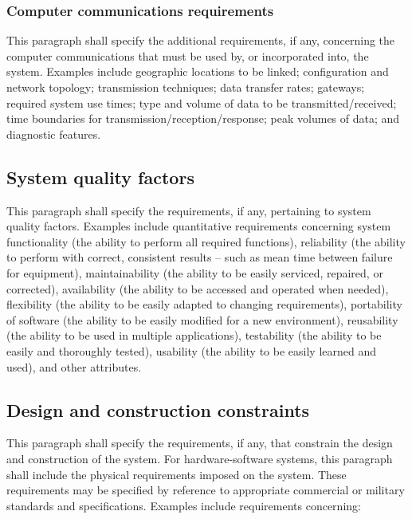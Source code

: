 \documentclass{fidata-report-template}
\begin{document}
\subsubsection{Computer communications requirements}

This paragraph shall specify the additional requirements, if any,
concerning the computer communications that must be used by, or
incorporated into, the system. Examples include geographic locations to
be linked; configuration and network topology; transmission techniques;
data transfer rates; gateways; required system use times; type and
volume of data to be transmitted/received; time boundaries for
transmission/reception/response; peak volumes of data; and diagnostic
features.

\subsection{System quality factors}

This paragraph shall specify the requirements, if any, pertaining to
system quality factors. Examples include quantitative requirements
concerning system functionality (the ability to perform all required
functions), reliability (the ability to perform with correct, consistent
results -- such as mean time between failure for equipment),
maintainability (the ability to be easily serviced, repaired, or
corrected), availability (the ability to be accessed and operated when
needed), flexibility (the ability to be easily adapted to changing
requirements), portability of software (the ability to be easily
modified for a new environment), reusability (the ability to be used in
multiple applications), testability (the ability to be easily and
thoroughly tested), usability (the ability to be easily learned and
used), and other attributes.

\subsection{Design and construction constraints}

This paragraph shall specify the requirements, if any, that constrain
the design and construction of the system. For hardware-software
systems, this paragraph shall include the physical requirements imposed
on the system. These requirements may be specified by reference to
appropriate commercial or military standards and specifications.
Examples include requirements concerning:
\end{document}
